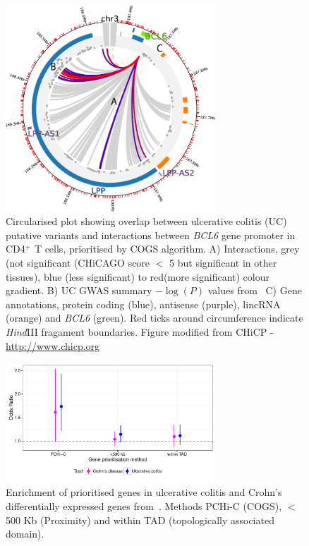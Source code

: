 \documentclass[a4paper,11pt]{report}
\begin{document}
\begin{figure}[ht]
\centering
\includegraphics[width=0.7\textwidth]{CHiCP-BCL6-Naive_CD4.pdf}
\caption{Circularised plot showing overlap between ulcerative colitis (UC) putative variants and  interactions between \textit{BCL6} gene promoter in CD4$^+$ T cells, prioritised by COGS algorithm. A) Interactions, grey (not significant (CHiCAGO score $<$ 5 but significant in other tissues), blue (less significant) to red(more significant) colour gradient. B) UC GWAS summary $-\log(P)$ values from~\citet{Anderson2011-ch} C)  Gene annotations, protein coding (blue), antisense (purple), lincRNA (orange) and \textit{BCL6} (green). Red ticks around circumference indicate \textit{Hind}III fragament boundaries. Figure modified from CHiCP - \url{http://www.chicp.org}~\citep{SchofieldCarverAchuthanEtAl2016} }
\label{fig:bcl6}
\end{figure}

\begin{figure}[ht]
\centering
\includegraphics[width=0.7\textwidth]{ibd-tadprox.pdf}
\caption{Enrichment of prioritised genes in ulcerative colitis and Crohn's differentially expressed genes from~\citet{PetersLyonsLeeEtAl2016}. Methods PCHi-C (COGS), $<$ 500 Kb (Proximity) and within TAD (topologically associated domain).}
\label{fig:peters_odds_ratio}
\end{figure}
\end{document}
